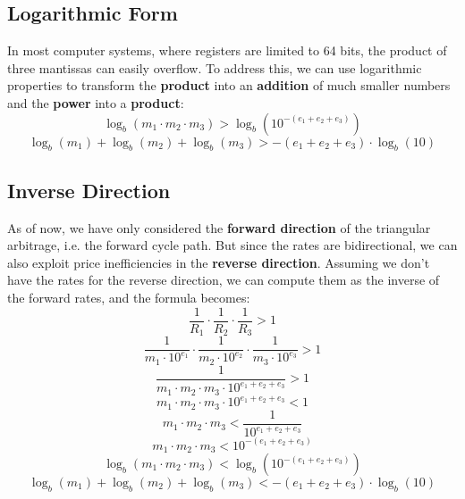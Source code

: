 \documentclass[11pt]{article}
\begin{document}
\subsection{Logarithmic Form}
In most computer systems, where registers are limited to 64 bits, the product of three mantissas can easily overflow. To address this, we can use logarithmic properties to transform the \textbf{product} into an \textbf{addition} of much smaller numbers and the \textbf{power} into a \textbf{product}:
\begin{equation}
    \log_b(m_1 \cdot m_2 \cdot m_3) > \log_b(10^{-(e_1 + e_2 + e_3)})
\end{equation}
\begin{equation}
    \log_b(m_1) + \log_b(m_2) + \log_b(m_3) > -(e_1 + e_2 + e_3) \cdot \log_b(10)
\end{equation}

\subsection{Inverse Direction}
As of now, we have only considered the \textbf{forward direction} of the triangular arbitrage, i.e. the forward cycle path. But since the rates are bidirectional, we can also exploit price inefficiencies in the \textbf{reverse direction}. Assuming we don't have the rates for the reverse direction, we can compute them as the inverse of the forward rates, and the formula becomes:
\setcounter{equation}{0}
\begin{equation}
    \frac{1}{R_{1}} \cdot \frac{1}{R_{2}} \cdot \frac{1}{R_{3}} > 1
\end{equation}
\begin{equation}
    \frac{1}{m_1 \cdot 10^{e_1}} \cdot \frac{1}{m_2 \cdot 10^{e_2}} \cdot \frac{1}{m_3 \cdot 10^{e_3}} > 1
\end{equation}
\begin{equation}
    \frac{1}{m_1 \cdot m_2 \cdot m_3 \cdot 10^{e_1 + e_2 + e_3}} > 1
\end{equation}
\begin{equation}
    m_1 \cdot m_2 \cdot m_3 \cdot 10^{e_1 + e_2 + e_3} < 1
\end{equation}
\begin{equation}
    m_1 \cdot m_2 \cdot m_3 < \frac{1}{10^{e_1 + e_2 + e_3}}
\end{equation}
\begin{equation}
    m_1 \cdot m_2 \cdot m_3 < 10^{-(e_1 + e_2 + e_3)}
\end{equation}
\begin{equation}
    \log_b(m_1 \cdot m_2 \cdot m_3) < \log_b(10^{-(e_1 + e_2 + e_3)})
\end{equation}
\begin{equation}
    \log_b(m_1) + \log_b(m_2) + \log_b(m_3) < -(e_1 + e_2 + e_3) \cdot \log_b(10)
\end{equation}
\end{document}
